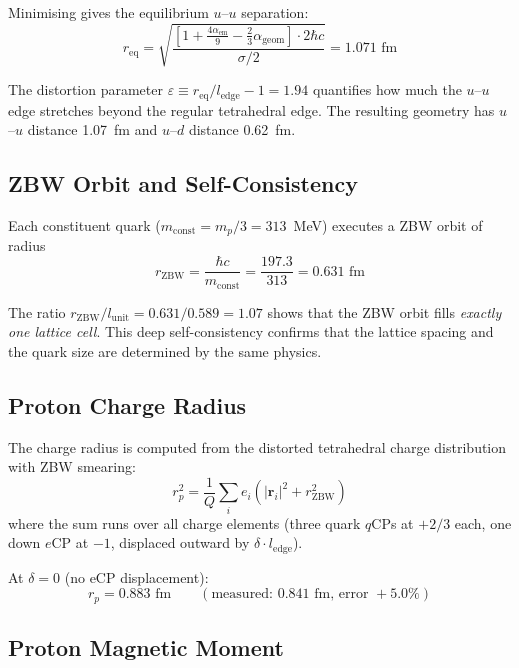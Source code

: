 \documentclass[12pt,a4paper]{article}
\begin{document}
Minimising gives the equilibrium $u$--$u$ separation:
\begin{equation}
r_{\mathrm{eq}} = \sqrt{\frac{\left[1 + \frac{4\alpha_{\mathrm{em}}}{9} - \frac{2}{3}\alpha_{\mathrm{geom}}\right] \cdot 2\hbar c}{\sigma/2}} = 1.071 \text{ fm}
\end{equation}

The distortion parameter $\varepsilon \equiv r_{\mathrm{eq}}/l_{\mathrm{edge}} - 1 = 1.94$ quantifies how much the $u$--$u$ edge stretches beyond the regular tetrahedral edge. The resulting geometry has $u$--$u$ distance 1.07~fm and $u$--$d$ distance 0.62~fm.

\subsection{ZBW Orbit and Self-Consistency}

Each constituent quark ($m_{\mathrm{const}} = m_p/3 = 313$~MeV) executes a ZBW orbit of radius
\begin{equation}
r_{\mathrm{ZBW}} = \frac{\hbar c}{m_{\mathrm{const}}} = \frac{197.3}{313} = 0.631 \text{ fm}
\end{equation}

The ratio $r_{\mathrm{ZBW}}/l_{\mathrm{unit}} = 0.631/0.589 = 1.07$ shows that the ZBW orbit fills \emph{exactly one lattice cell}. This deep self-consistency confirms that the lattice spacing and the quark size are determined by the same physics.

\subsection{Proton Charge Radius}

The charge radius is computed from the distorted tetrahedral charge distribution with ZBW smearing:
\begin{equation}
r_p^2 = \frac{1}{Q}\sum_i e_i\left(|\mathbf{r}_i|^2 + r_{\mathrm{ZBW}}^2\right)
\end{equation}
where the sum runs over all charge elements (three quark $q$CPs at $+2/3$ each, one down $e$CP at $-1$, displaced outward by $\delta \cdot l_{\mathrm{edge}}$).

At $\delta = 0$ (no eCP displacement):
\begin{equation}
r_p = 0.883 \text{ fm} \qquad (\text{measured: } 0.841 \text{ fm, error } +5.0\%)
\end{equation}

\subsection{Proton Magnetic Moment}
\end{document}
